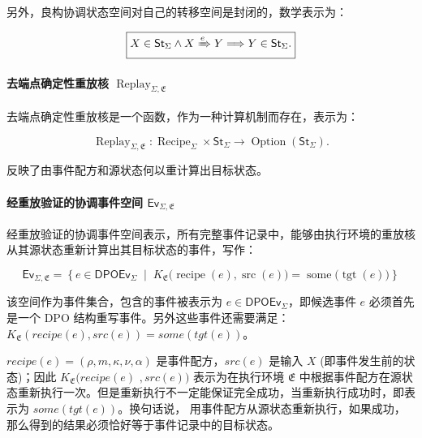 另外，良构协调状态空间对自己的转移空间是封闭的，数学表示为：

\begin{equation}
  \boxed{
    X\in\mathsf{St}_\Sigma
    \land
    X\xRightarrow eY
    \Longrightarrow
    Y\in\mathsf{St}_\Sigma.
  }\label{eq:well-formed-coordination-state-space-transformation}
\end{equation}

\paragraph{去端点确定性重放核 $\operatorname{Replay}_{\Sigma,\mathfrak E}$} 去端点确定性重放核是一个函数，作为一种计算机制而存在，表示为：

\begin{equation}
  \boxed{
    \operatorname{Replay}_{\Sigma,\mathfrak E}:
    \operatorname{Recipe}_{\Sigma}
    \times
    \mathsf{St}_{\Sigma}
    \longrightarrow
    \operatorname{Option}(\mathsf{St}_{\Sigma}).
  }\label{eq:deterministic-replay-kernel-interface}
\end{equation}

反映了由事件配方和源状态何以重计算出目标状态。

\paragraph{经重放验证的协调事件空间 $\mathsf{Ev}_{\Sigma,\mathfrak E}$} 经重放验证的协调事件空间表示，所有完整事件记录中，能够由执行环境的重放核从其源状态重新计算出其目标状态的事件，写作：

\begin{equation}
  \boxed{
    \mathsf{Ev}_{\Sigma,\mathfrak E}
    =
    \left\{
      e\in\mathsf{DPOEv}_{\Sigma}
      \;\middle|\;
      K_{\mathfrak E}
      \bigl(
        \operatorname{recipe}(e),
        \operatorname{src}(e)
      \bigr)
      =
      \operatorname{some}\bigl(\operatorname{tgt}(e)\bigr)
    \right\}
  }\label{eq:replay-verified-coordination-event-space}
\end{equation}

该空间作为事件集合，包含的事件被表示为 $e\in\mathsf{DPOEv}_{\Sigma}$，即候选事件 $e$ 必须首先是一个 DPO 结构重写事件。另外这些事件还需要满足：$K_{\mathfrak E}(recipe(e),src(e))=some(tgt(e))$。

$recipe(e)=(\rho,m,\kappa,\nu,\alpha)$ 是事件配方，$src(e)$ 是输入 $X$ (即事件发生前的状态)；因此 $K_{\mathfrak E}(recipe(e)$ $,src(e))$ 表示为在执行环境 $\mathfrak E$ 中根据事件配方在源状态重新执行一次。但是重新执行不一定能保证完全成功，当重新执行成功时，即表示为 $some(tgt(e))$。换句话说， 用事件配方从源状态重新执行，如果成功，那么得到的结果必须恰好等于事件记录中的目标状态。

